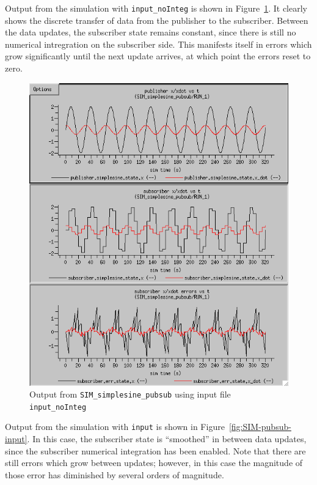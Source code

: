 Output from the simulation with {\tt input\_noInteg}
is shown in Figure~\ref{fig:SIM-pubsub-input-noInteg}.
It clearly shows the discrete transfer of data from the publisher to the
subscriber.
Between the data updates, the subscriber state remains constant,
since there is still no numerical intregration on the subscriber side.
This manifests itself in errors which grow significantly until the next
update arrives, at which point the errors reset to zero.

\begin{figure}[b]
  \begin{center}
    \includegraphics[width=4.5in]{TrickHLAUser-prelim-SIM-pubsub-input-noInteg.png}
  \end{center}
\caption{Output from {\tt SIM\_simplesine\_pubsub} using input file {\tt input\_noInteg}}
\label{fig:SIM-pubsub-input-noInteg}
\end{figure}


Output from the simulation with {\tt input}
is shown in Figure~\ref{fig:SIM-pubsub-input}.
In this case, the subscriber state is ``smoothed'' in between data updates,
since the subscriber numerical integration has been enabled.
Note that there are still errors which grow between updates;
however, in this case the magnitude of those error has diminished by several
orders of magnitude.

